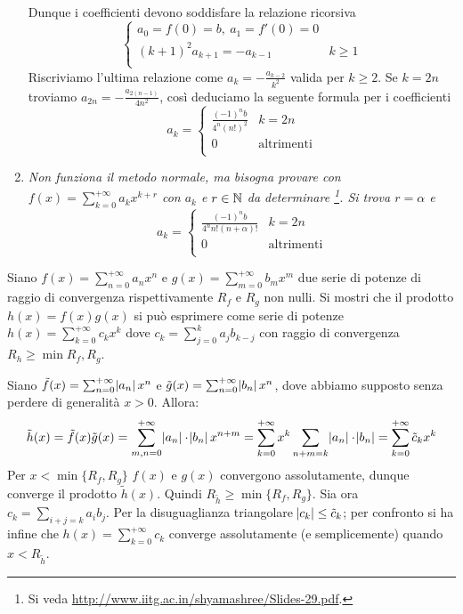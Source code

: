 \begin{enumerate}[label = (\roman*)]
\begin{gather*}
  \end{gather*}
  Dunque i coefficienti devono soddisfare la relazione ricorsiva
  \begin{equation*}
    \begin{cases}
      a_0 = f(0) = b, \ a_1 = f'(0) = 0 \\
      (k + 1)^2 a_{k + 1} = - a_{k - 1} & k \geq 1 \\
    \end{cases}
  \end{equation*}
  Riscriviamo l'ultima relazione come $ a_k = - \frac{a_{k - 2}}{k^2} $ valida per $ k \geq 2 $. Se $ k = 2n $ troviamo $ a_{2n} = - \frac{a_{2(n - 1)}}{4 n^2} $, così deduciamo la seguente formula per i coefficienti
  \begin{equation*}
    a_k =
    \begin{cases}
      \frac{(-1)^n b}{4^{n} (n!)^2} & k = 2n \\
      0 & \text{altrimenti} \\
    \end{cases}
  \end{equation*}
\item \emph{Non funziona il metodo normale, ma bisogna provare con $ f(x) = \sum_{k = 0}^{+\infty} a_k x^{k + r} $ con $ a_k $ e $ r \in \mathbb{N} $ da determinare \footnote{Si veda \url{http://www.iitg.ac.in/shyamashree/Slides-29.pdf}.}. Si trova $ r = \alpha $ e }
  \begin{equation*}
    a_k =
    \begin{cases}
      \frac{(-1)^n b}{4^n n! (n + \alpha)!} & k = 2n \\
      0 & \text{altrimenti} \\
    \end{cases}
  \end{equation*}
\end{enumerate}

\begin{es} \label{es:prodotto_cauchy}
  Siano $ f(x) = \sum_{n = 0}^{+\infty} a_n x^n $ e $ g(x) = \sum_{m = 0}^{+\infty} b_m x^m $ due serie di potenze di raggio di convergenza rispettivamente $ R_f $ e $ R_g $  non nulli. Si mostri che il prodotto $ h(x) = f(x) g(x) $ si può esprimere come serie di potenze $ h(x) = \sum_{k = 0}^{+\infty} c_k x^k $ dove $ c_k = \sum_{j = 0}^{k} a_j b_{k - j} $ con raggio di convergenza $ R_h \geq \min{R_f, R_g} $.
\end{es}
Siano $ \tilde f(x) = \sum_{n=0}^{+\infty} \abs{a_n} x^n $ e $ \tilde g(x) = \sum_{n=0}^{+\infty} \abs{b_n} x^n $, dove abbiamo supposto senza perdere di generalità $ x>0 $. Allora:
\[ \tilde h(x) = \tilde f(x) \tilde g(x) = \sum_{m,n=0}^{+\infty} \abs{a_n} \cdot \abs{b_n} x^{n+m} = \sum_{k=0}^{+\infty} x^k \sum_{n+m=k} \abs{a_n} \cdot \abs{b_n} = \sum_{k=0}^{+\infty} \tilde c_k x^k \]
Per $ x < \min\{R_f, R_g \} $ $ f(x) $ e $ g(x) $ convergono assolutamente, dunque converge il prodotto $ \tilde h(x) $. Quindi $ R_{\tilde h} \ge \min\{ R_f, R_g\} $. Sia ora $ c_k = \sum_{i+j=k} a_i b_j $. Per la disuguaglianza triangolare $ \abs{c_k} \le \tilde c_k $; per confronto si ha infine che $ h(x) = \sum_{k=0}^{+\infty} c_k $ converge assolutamente (e semplicemente) quando $ x < R_{\tilde h} $.

